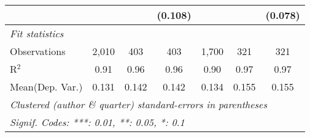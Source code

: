 \begin{tabular}{lcccccc}
                           &         &         & (0.108)       &         &             & (0.078)\\   
   \midrule
   \emph{Fit statistics}\\
   Observations            & 2,010   & 403     & 403           & 1,700   & 321         & 321\\  
   R$^2$                   & 0.91    & 0.96    & 0.96          & 0.90    & 0.97        & 0.97\\  
Mean(Dep. Var.) & 0.131 & 0.142 & 0.142 & 0.134 & 0.155 & 0.155 \\
   \midrule \midrule
   \multicolumn{7}{l}{\emph{Clustered (author \& quarter) standard-errors in parentheses}}\\
   \multicolumn{7}{l}{\emph{Signif. Codes: ***: 0.01, **: 0.05, *: 0.1}}\\
\end{tabular}
\par\endgroup
